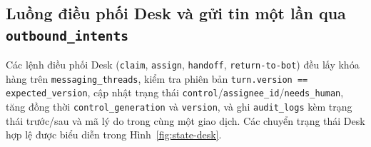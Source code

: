 

\subsection{Luồng điều phối Desk và gửi tin một lần qua \texttt{outbound\_\hspace{0pt}intents}}
Các lệnh điều phối Desk (\texttt{claim}, \texttt{assign}, \texttt{handoff}, \texttt{return-\hspace{0pt}to-\hspace{0pt}bot}) đều lấy khóa hàng trên \texttt{messaging\_\hspace{0pt}threads}, kiểm tra phiên bản \texttt{turn.\hspace{0pt}version == expected\_\hspace{0pt}version}, cập nhật trạng thái \texttt{control}/\texttt{assignee\_\hspace{0pt}id}/\texttt{needs\_\hspace{0pt}human}, tăng đồng thời \texttt{control\_\hspace{0pt}generation} và \texttt{version}, và ghi \texttt{audit\_\hspace{0pt}logs} kèm trạng thái trước/sau và mã lý do trong cùng một giao dịch.
Các chuyển trạng thái Desk hợp lệ được biểu diễn trong Hình~\ref{fig:state-desk}.



